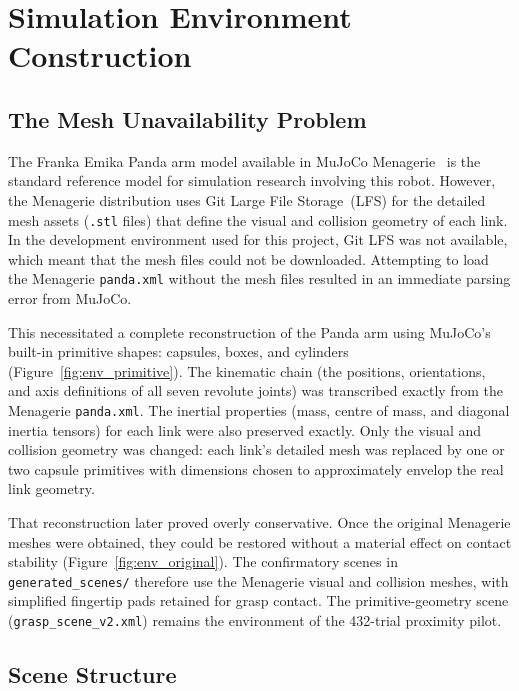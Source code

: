 \documentclass[11pt,a4paper]{report}
\begin{document}
\section{Simulation Environment Construction}
\label{sec:sim_construction}

\subsection{The Mesh Unavailability Problem}

The Franka Emika Panda arm model available in MuJoCo Menagerie~\cite{menagerie2022} is the standard reference model for simulation research involving this robot. However, the Menagerie distribution uses Git Large File Storage~(LFS) for the detailed mesh assets (\texttt{.stl} files) that define the visual and collision geometry of each link. In the development environment used for this project, Git LFS was not available, which meant that the mesh files could not be downloaded. Attempting to load the Menagerie \texttt{panda.xml} without the mesh files resulted in an immediate parsing error from MuJoCo.

This necessitated a complete reconstruction of the Panda arm using MuJoCo's built-in primitive shapes: capsules, boxes, and cylinders (Figure~\ref{fig:env_primitive}). The kinematic chain (the positions, orientations, and axis definitions of all seven revolute joints) was transcribed exactly from the Menagerie \texttt{panda.xml}. The inertial properties (mass, centre of mass, and diagonal inertia tensors) for each link were also preserved exactly. Only the visual and collision geometry was changed: each link's detailed mesh was replaced by one or two capsule primitives with dimensions chosen to approximately envelop the real link geometry.

That reconstruction later proved overly conservative. Once the original Menagerie meshes were obtained, they could be restored without a material effect on contact stability (Figure~\ref{fig:env_original}). The confirmatory scenes in \texttt{generated\_scenes/} therefore use the Menagerie visual and collision meshes, with simplified fingertip pads retained for grasp contact. The primitive-geometry scene (\texttt{grasp\_scene\_v2.xml}) remains the environment of the 432-trial proximity pilot.

\subsection{Scene Structure}
\end{document}
